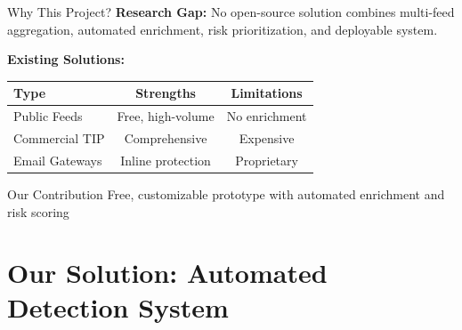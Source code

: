 \documentclass[aspectratio=169]{beamer}
\begin{document}
\begin{frame}{Why This Project?}
\vspace{-0.2cm}
\scriptsize
\textbf{Research Gap:} No open-source solution combines multi-feed aggregation, automated enrichment, risk prioritization, and deployable system.

\vspace{0.1cm}
\textbf{Existing Solutions:}

\begin{center}
\scriptsize
\begin{tabular}{lcc}
\toprule
\textbf{Type} & \textbf{Strengths} & \textbf{Limitations} \\
\midrule
Public Feeds & Free, high-volume & No enrichment \\
Commercial TIP & Comprehensive & Expensive \\
Email Gateways & Inline protection & Proprietary \\
\bottomrule
\end{tabular}
\end{center}

\vspace{0.1cm}
\begin{alertblock}{Our Contribution}
\scriptsize
Free, customizable prototype with automated enrichment and risk scoring
\end{alertblock}
\end{frame}

\section{Our Solution: Automated Detection System}
\end{document}
